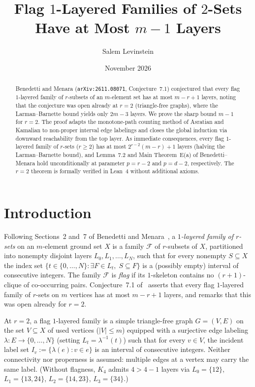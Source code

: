 \documentclass[11pt]{article}
\title{Flag $1$-Layered Families of $2$-Sets Have at Most $m - 1$ Layers}
\author{Salem Levinstein}
\date{November 2026}
\begin{document}
\maketitle

\begin{abstract}
Benedetti and Menara (\texttt{arXiv:2611.08071}, Conjecture~7.1) conjectured that every flag $1$-layered family of $r$-subsets of an $m$-element set has at most $m - r + 1$ layers, noting that the conjecture was open already at $r = 2$ (triangle-free graphs), where the Larman--Barnette bound yields only $2m - 3$ layers. We prove the sharp bound $m - 1$ for $r = 2$. The proof adapts the monotone-path counting method of Asratian and Kamalian to non-proper interval edge labelings and closes the global induction via downward reachability from the top layer. As immediate consequences, every flag $1$-layered family of $r$-sets ($r \ge 2$) has at most $2^{r-2}(m - r) + 1$ layers (halving the Larman--Barnette bound), and Lemma~7.2 and Main Theorem~E(a) of Benedetti--Menara hold unconditionally at parameter $p = r - 2$ and $p = d - 2$, respectively. The $r = 2$ theorem is formally verified in Lean~4 without additional axioms.
\end{abstract}

\section{Introduction}

Following Sections~2 and~7 of Benedetti and Menara~\cite{BM2026}, a \emph{$1$-layered family of $r$-sets} on an $m$-element ground set $X$ is a family $\mathcal{F}$ of $r$-subsets of $X$, partitioned into nonempty disjoint layers $L_0, L_1, \dots, L_N$, such that for every nonempty $S \subseteq X$ the index set $\{t \in \{0, \dots, N\} : \exists F \in L_t,\; S \subseteq F\}$ is a (possibly empty) interval of consecutive integers. The family $\mathcal{F}$ is \emph{flag} if its $1$-skeleton contains no $(r + 1)$-clique of co-occurring pairs. Conjecture~7.1 of~\cite{BM2026} asserts that every flag $1$-layered family of $r$-sets on $m$ vertices has at most $m - r + 1$ layers, and remarks that this was open already for $r = 2$.

At $r = 2$, a flag $1$-layered family is a simple triangle-free graph $G = (V, E)$ on the set $V \subseteq X$ of used vertices ($|V| \le m$) equipped with a surjective edge labeling $\lambda : E \to \{0, \dots, N\}$ (setting $L_t = \lambda^{-1}(t)$) such that for every $v \in V$, the incident label set $I_v := \{\lambda(e) : v \in e\}$ is an interval of consecutive integers. Neither connectivity nor properness is assumed: multiple edges at a vertex may carry the same label. (Without flagness, $K_4$ admits $4 > 4 - 1$ layers via $L_0 = \{12\}$, $L_1 = \{13, 24\}$, $L_2 = \{14, 23\}$, $L_3 = \{34\}$.)
\end{document}

